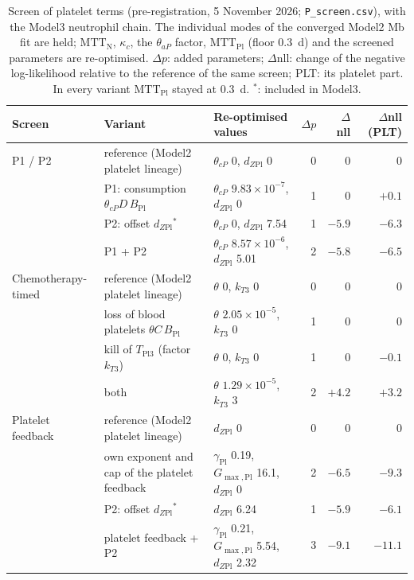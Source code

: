 \begin{table}[!htbp]
\centering
\footnotesize
\setlength{\tabcolsep}{3.5pt}
\caption{Screen of platelet terms (pre-registration, 5 November 2026; \texttt{P\_screen.csv}), with the Model3 neutrophil chain. The individual modes of the converged Model2 Mb fit are held; $\mathrm{MTT}_{\mathrm{N}}$, $\kappa_c$, the $\theta_{aP}$ factor, $\mathrm{MTT}_{\mathrm{Pl}}$ (floor 0.3~d) and the screened parameters are re-optimised. $\Delta p$: added parameters; $\Delta$nll: change of the negative log-likelihood relative to the reference of the same screen; PLT: its platelet part. In every variant $\mathrm{MTT}_{\mathrm{Pl}}$ stayed at 0.3~d. $^{\ast}$: included in Model3.}
\label{tab:pscreen}
\begin{tabular}{>{\raggedright\arraybackslash}p{2.2cm}>{\raggedright\arraybackslash}p{4.6cm}>{\raggedright\arraybackslash}p{4.4cm}rrr}
\toprule
Screen & Variant & Re-optimised values & $\Delta p$ & $\Delta$nll & $\Delta$nll (PLT) \\
\midrule
P1 / P2 & reference (Model2 platelet lineage) & $\theta_{cP}$ 0, $d_{Z\mathrm{Pl}}$ 0 & 0 & 0 & 0 \\
 & P1: consumption $\theta_{cP}D\,B_{\mathrm{Pl}}$ & $\theta_{cP}$ $9.83\times10^{-7}$, $d_{Z\mathrm{Pl}}$ 0 & 1 & 0 & $+0.1$ \\
 & P2: offset $d_{Z\mathrm{Pl}}$$^{\ast}$ & $\theta_{cP}$ 0, $d_{Z\mathrm{Pl}}$ 7.54 & 1 & $-5.9$ & $-6.3$ \\
 & P1 + P2 & $\theta_{cP}$ $8.57\times10^{-6}$, $d_{Z\mathrm{Pl}}$ 5.01 & 2 & $-5.8$ & $-6.5$ \\
\midrule
Chemotherapy-timed & reference (Model2 platelet lineage) & $\theta$ 0, $k_{T3}$ 0 & 0 & 0 & 0 \\
 & loss of blood platelets $\theta C\,B_{\mathrm{Pl}}$ & $\theta$ $2.05\times10^{-5}$, $k_{T3}$ 0 & 1 & 0 & 0 \\
 & kill of $T_{\mathrm{Pl}3}$ (factor $k_{T3}$) & $\theta$ 0, $k_{T3}$ 0 & 1 & 0 & $-0.1$ \\
 & both & $\theta$ $1.29\times10^{-5}$, $k_{T3}$ 3 & 2 & $+4.2$ & $+3.2$ \\
\midrule
Platelet feedback & reference (Model2 platelet lineage) & $d_{Z\mathrm{Pl}}$ 0 & 0 & 0 & 0 \\
 & own exponent and cap of the platelet feedback & $\gamma_{\mathrm{Pl}}$ 0.19, $G_{\max,\mathrm{Pl}}$ 16.1, $d_{Z\mathrm{Pl}}$ 0 & 2 & $-6.5$ & $-9.3$ \\
 & P2: offset $d_{Z\mathrm{Pl}}$$^{\ast}$ & $d_{Z\mathrm{Pl}}$ 6.24 & 1 & $-5.9$ & $-6.1$ \\
 & platelet feedback + P2 & $\gamma_{\mathrm{Pl}}$ 0.21, $G_{\max,\mathrm{Pl}}$ 5.54, $d_{Z\mathrm{Pl}}$ 2.32 & 3 & $-9.1$ & $-11.1$ \\
\bottomrule
\end{tabular}
\end{table}
